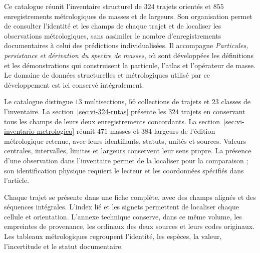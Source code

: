 \documentclass[a4paper,10pt]{article}
\let\HMTIndiceOriginal\tableofcontents
\renewcommand{\tableofcontents}{\clearpage\begingroup\setlength{\parskip}{0pt}\fontsize{9.2}{10.5}\selectfont\HMTIndiceOriginal\endgroup\clearpage}
\begin{document}
\begin{minipage}{\textwidth}
Ce catalogue réunit l'inventaire structurel de \(324\) trajets orientés
et \(855\) enregistrements métrologiques de masses et de largeurs. Son organisation
permet de consulter l'identité et les champs de chaque trajet et de localiser
les observations métrologiques, sans assimiler le nombre d'enregistrements
documentaires à celui des prédictions individualisées. Il accompagne
\emph{Particules, persistance et dérivation du spectre de masses}, où sont
développées les définitions et les démonstrations qui construisent la particule,
l'atlas et l'opérateur de masse. Le domaine de données structurelles et
métrologiques utilisé par ce développement est ici conservé intégralement.

Le catalogue distingue \(13\) multisections, \(56\) collections de trajets et
\(23\) classes de l'inventaire. La section~\ref{sec:vi-324-rutas} présente les
\(324\) trajets en conservant tous les champs de leurs deux enregistrements
concordants. La section~\ref{sec:vi-inventario-metrologico} réunit \(471\) masses
et \(384\) largeurs de l'édition métrologique retenue, avec leurs identifiants,
statuts, unités et sources. Valeurs centrales, intervalles, limites et largeurs
conservent leur sens propre. La présence d'une observation dans l'inventaire
permet de la localiser pour la comparaison ; son identification physique
requiert le lecteur et les coordonnées spécifiés dans l'article.

Chaque trajet se présente dans une fiche complète, avec des champs alignés et
des séquences intégrales. L'index lié et les signets permettent de localiser
chaque cellule et orientation. L'annexe technique conserve, dans ce même
volume, les empreintes de provenance, les ordinaux des deux sources et leurs
codes originaux. Les tableaux métrologiques regroupent l'identité, les espèces,
la valeur, l'incertitude et le statut documentaire.\par
\end{minipage}
\par\endgroup
\clearpage
\tableofcontents
\clearpage



\end{document}
